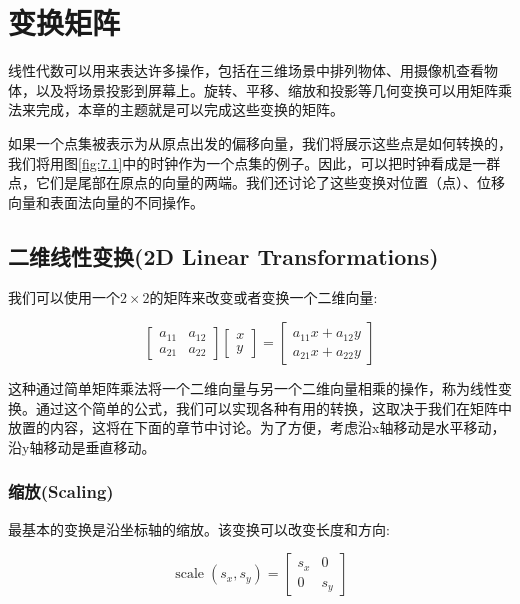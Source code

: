 
\chapter{变换矩阵}
\label{chap07}

线性代数可以用来表达许多操作，包括在三维场景中排列物体、用摄像机查看物体，以及将场景投影到屏幕上。旋转、平移、缩放和投影等几何变换可以用矩阵乘法来完成，本章的主题就是可以完成这些变换的矩阵。

如果一个点集被表示为从原点出发的偏移向量，我们将展示这些点是如何转换的，我们将用图\ref{fig:7.1}中的时钟作为一个点集的例子。因此，可以把时钟看成是一群点，它们是尾部在原点的向量的两端。我们还讨论了这些变换对位置（点）、位移向量和表面法向量的不同操作。

\section{二维线性变换(2D Linear Transformations)}

我们可以使用一个$2 \times 2$的矩阵来改变或者变换一个二维向量:

\begin{equation}
	\left[\begin{array}{ll}
		a_{11} & a_{12} \\
		a_{21} & a_{22}
	\end{array}\right]\left[\begin{array}{l}
		x \\
		y
	\end{array}\right]=\left[\begin{array}{l}
		a_{11} x+a_{12} y \\
		a_{21} x+a_{22} y
	\end{array}\right]
\nonumber
\end{equation}

这种通过简单矩阵乘法将一个二维向量与另一个二维向量相乘的操作，称为线性变换。通过这个简单的公式，我们可以实现各种有用的转换，这取决于我们在矩阵中放置的内容，这将在下面的章节中讨论。为了方便，考虑沿x轴移动是水平移动，沿y轴移动是垂直移动。

\subsection{缩放(Scaling)}

最基本的变换是沿坐标轴的缩放。该变换可以改变长度和方向:

\begin{equation}
	\operatorname{scale}\left(s_x, s_y\right)=\left[\begin{array}{cc}
		s_x & 0 \\
		0 & s_y
	\end{array}\right]
\nonumber
\end{equation}

